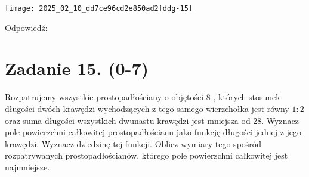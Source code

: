 \documentclass[10pt]{article}
\begin{document}
\begin{center}
\texttt{[image: 2025\_02\_10\_dd7ce96cd2e850ad2fddg-15]}
\end{center}

Odpowiedź:

\section*{Zadanie 15. (0-7)}
Rozpatrujemy wszystkie prostopadłościany o objętości 8 , których stosunek długości dwóch krawędzi wychodzących z tego samego wierzchołka jest równy \(1: 2\) oraz suma długości wszystkich dwunastu krawędzi jest mniejsza od 28. Wyznacz pole powierzchni całkowitej prostopadłościanu jako funkcję długości jednej z jego krawędzi. Wyznacz dziedzinę tej funkcji. Oblicz wymiary tego spośród rozpatrywanych prostopadłościanów, którego pole powierzchni całkowitej jest najmniejsze.
\end{document}
